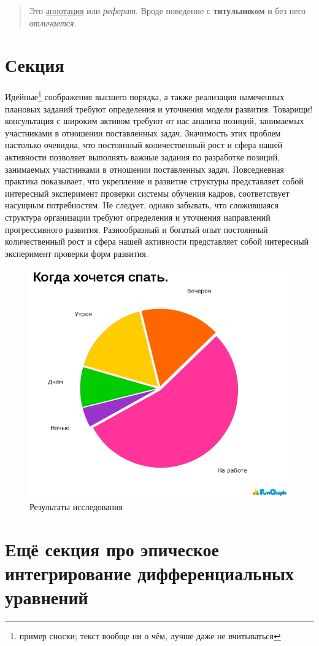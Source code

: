 \documentclass{hedwork}
\begin{document}
\maketitle
\begin{abstract}
    Это \underline{аннотация} или \emph{реферат}. Вроде поведение с
    \textbf{титульником} и без него \textit{отличается}.
\end{abstract}
\tableofcontents
\section{Секция}
Идейные\footnote{пример сноски; текст вообще ни о чём, лучше даже не
вчитываться} соображения высшего порядка, а также реализация намеченных плановых заданий требуют определения и уточнения модели развития. Товарищи! консультация с широким активом требуют от нас анализа позиций, занимаемых участниками в отношении поставленных задач. Значимость этих проблем настолько очевидна, что постоянный количественный рост и сфера нашей активности позволяет выполнять важные задания по разработке позиций, занимаемых участниками в отношении поставленных задач. Повседневная практика показывает, что укрепление и развитие структуры представляет собой интересный эксперимент проверки системы обучения кадров, соответствует насущным потребностям. Не следует, однако забывать, что сложившаяся структура организации требуют определения и уточнения направлений прогрессивного развития. Разнообразный и богатый опыт постоянный количественный рост и сфера нашей активности представляет собой интересный эксперимент проверки форм развития.
\begin{figure}[t]
    \center
    \includegraphics[width=.47\textwidth]{image1.jpg}
    \caption[Результаты исследования (сон)]{Результаты исследования}
\end{figure}
\section{Ещё секция про эпическое интегрирование дифференциальных
уравнений}
\end{document}
